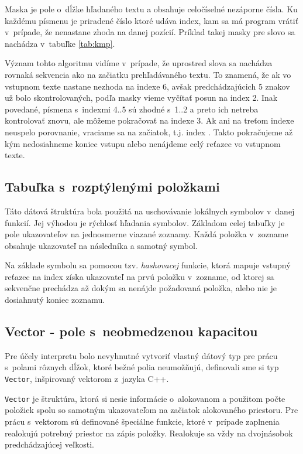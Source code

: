 \documentclass[12pt,a4paper,titlepage,final]{article}
\begin{document}
Maska je pole o~dĺžke hľadaného textu a obsahuje celočíselné nezáporne čísla.
Ku každému písmenu je priradené číslo ktoré udáva index, kam sa má program
 vrátiť v~prípade, že nenastane zhoda na danej pozícií. Príklad takej masky
 pre slovo  sa nachádza v~tabuľke \ref{tab:kmp}.

Význam tohto algoritmu vidíme v~prípade, že uprostred slova sa nachádza
 rovnaká sekvencia ako na začiatku prehľadávaného textu.
To znamená, že ak vo vstupnom texte nastane nezhoda na indexe 6, avšak
 predchádzajúcich 5 znakov už bolo skontrolovaných, podľa masky vieme vyčítať
 posun na index 2. Inak povedané, písmena s~indexmi 4..5 sú zhodné s~1..2
 a preto ich netreba kontrolovať znovu, ale môžeme pokračovať na indexe 3.
Ak ani na treťom indexe neuspelo porovnanie, vraciame sa na začiatok, t.j.
index . Takto pokračujeme až kým nedosiahneme koniec vstupu alebo
nenájdeme celý reťazec vo vstupnom texte.

\subsection{Tabuľka s~rozptýlenými položkami}
Táto dátová štruktúra bola použitá na uschovávanie lokálnych symbolov v~danej
 funkcií. Jej výhodou je rýchlosť hľadania symbolov. 
Základom celej tabuľky je pole ukazovateľov na jednosmerne viazané zoznamy.
Každá položka v~zozname obsahuje ukazovateľ na následníka a samotný symbol.

Na základe symbolu sa pomocou tzv. \emph{hashovacej} funkcie, 
 ktorá mapuje vstupný reťazec na index získa ukazovateľ na prvú položku
 v~zozname, od ktorej sa sekvenčne prechádza až dokým sa nenájde požadovaná
 položka, alebo nie je dosiahnutý koniec zoznamu.
 
\subsection{Vector - pole s~neobmedzenou kapacitou}
Pre účely interpretu bolo nevyhnutné vytvoriť vlastný dátový typ pre prácu
s~polami rôznych dĺžok, ktoré bežné polia neumožňujú, definovali sme si
typ \texttt{Vector}, inšpirovaný vektorom z~jazyka C++. 

\texttt{Vector} je štruktúra, ktorá si nesie informácie o~alokovanom a použitom 
počte položiek spolu so samotným ukazovateľom na začiatok alokovaného priestoru. 
Pre prácu s~vektorom sú definované špeciálne funkcie, ktoré v~prípade zaplnenia
realokujú potrebný priestor na zápis položky. Realokuje sa vždy na dvojnásobok
predchádzajúcej veľkosti.
\end{document}
